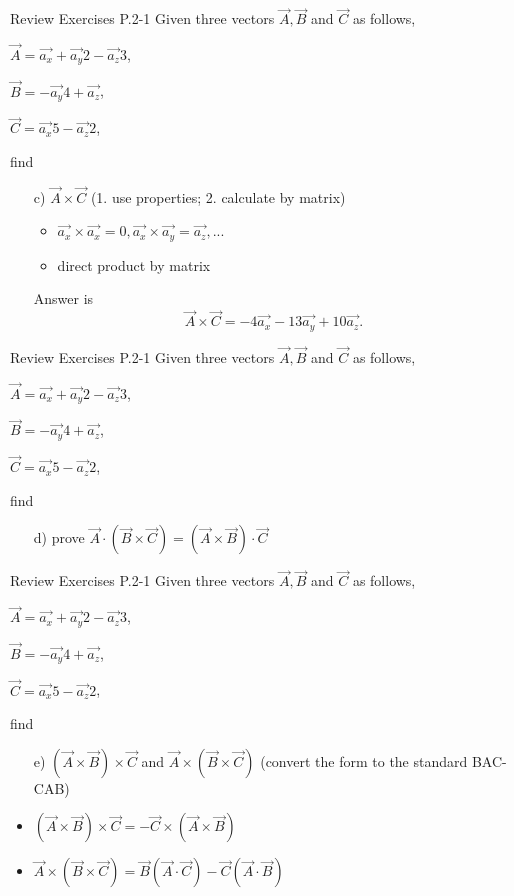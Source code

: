 \documentclass[xcolor={dvipsnames}]{beamer}
\begin{document}
\begin{frame}{Review Exercises}
P.2-1 Given three vectors $\vec{A},\vec{B}$ and $\vec{C}$ as follows,
    
    $\vec{A}=\vec{a_x}+\vec{a_y}2-\vec{a_z}3$,

    $\vec{B}=-\vec{a_y}4+\vec{a_z}$,

    $\vec{C}=\vec{a_x}5-\vec{a_z}2$,

    find
    \begin{itemize}
        \item[c)] $\vec{A}\times\vec{C}$ (1. use properties; 2. calculate by matrix)
        \break
        \pause
        \begin{itemize}
        	\item $\vec{a_x}\times\vec{a_x}=0,\vec{a_x}\times\vec{a_y}=\vec{a_z},...$
        	\item direct product by matrix
        \end{itemize}
        Answer is
        $$\vec{A}\times\vec{C}=-4\vec{a_x}-13\vec{a_y}+10\vec{a_z}.$$
    \end{itemize}
\end{frame}
\begin{frame}{Review Exercises}
P.2-1 Given three vectors $\vec{A},\vec{B}$ and $\vec{C}$ as follows,
    
    $\vec{A}=\vec{a_x}+\vec{a_y}2-\vec{a_z}3$,

    $\vec{B}=-\vec{a_y}4+\vec{a_z}$,

    $\vec{C}=\vec{a_x}5-\vec{a_z}2$,

    find
    \begin{itemize}
        \item[d)] prove $\vec{A}\cdot(\vec{B}\times\vec{C})=(\vec{A}\times\vec{B})\cdot\vec{C}$
    \end{itemize}
\end{frame}
\begin{frame}{Review Exercises}
P.2-1 Given three vectors $\vec{A},\vec{B}$ and $\vec{C}$ as follows,
    
    $\vec{A}=\vec{a_x}+\vec{a_y}2-\vec{a_z}3$,

    $\vec{B}=-\vec{a_y}4+\vec{a_z}$,

    $\vec{C}=\vec{a_x}5-\vec{a_z}2$,

    find
    \begin{itemize}
        \item[e)] $(\vec{A}\times\vec{B})\times\vec{C}$ and $\vec{A}\times(\vec{B}\times\vec{C})$ (convert the form to the standard BAC-CAB)
    \end{itemize}
    \pause
    \break
    \begin{itemize}
    	\item $(\vec{A}\times\vec{B})\times\vec{C}=-\vec{C}\times(\vec{A}\times\vec{B})$
    	\item $\vec{A}\times(\vec{B}\times\vec{C}) = \vec{B}(\vec{A}\cdot\vec{C}) - \vec{C}(\vec{A}\cdot\vec{B})$
    \end{itemize}
\end{frame}
\end{document}
